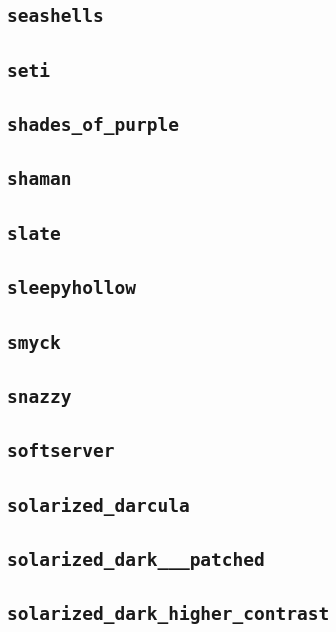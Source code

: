 \subsection{\texttt{seashells}}
\newpage
\subsection{\texttt{seti}}
\newpage
\subsection{\texttt{shades\_of\_purple}}
\newpage
\subsection{\texttt{shaman}}
\newpage
\subsection{\texttt{slate}}
\newpage
\subsection{\texttt{sleepyhollow}}
\newpage
\subsection{\texttt{smyck}}
\newpage
\subsection{\texttt{snazzy}}
\newpage
\subsection{\texttt{softserver}}
\newpage
\subsection{\texttt{solarized\_darcula}}
\newpage
\subsection{\texttt{solarized\_dark\_\_\_patched}}
\newpage
\subsection{\texttt{solarized\_dark\_higher\_contrast}}
\newpage
